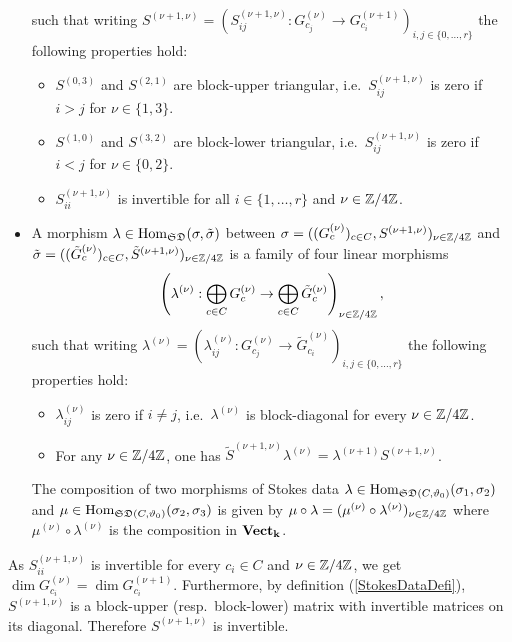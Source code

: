 \begin{defi}
\begin{itemize}
        such that writing $S^{(\nu+1,\nu)}=(S^{(\nu+1,\nu)}_{ij}:G_{c_j}^{(\nu)} \to G_{c_i}^{(\nu+1)})_{i,j \in \{0,\dots,r\}}$ the following properties hold:
        \begin{itemize}
            \item $S^{(0,3)}$ and $S^{(2,1)}$ are block-upper triangular, i.e.\ $S^{(\nu+1,\nu)}_{ij}$ is zero if $i > j$ for $\nu \in \{1,3\}$.
            \item $S^{(1,0)}$ and $S^{(3,2)}$ are block-lower triangular, i.e.\ $S^{(\nu+1,\nu)}_{ij}$ is zero if $i < j$ for $\nu \in \{0,2\}$.
            \item $S_{ii}^{(\nu+1,\nu)}$ is invertible for all $i \in \{1, \dots, r\}$ and $\nu \in \mathbb{Z}/4\mathbb{Z}$.
        \end{itemize}
        \item A morphism $\lambda \in \operatorname{Hom}_{\mathfrak{SD}}(\sigma, \tilde{\sigma})$ between $\sigma = ((G_c^{(\nu)})_{c \in C}, S^{(\nu+1, \nu)})_{\nu \in \mathbb{Z}/4\mathbb{Z}}$ and $\tilde{\sigma}=((\tilde{G}_c^{(\nu)})_{c \in C}, \tilde{S}^{(\nu+1, \nu)})_{\nu \in \mathbb{Z}/4\mathbb{Z}}$ is a family of four linear morphisms \[\left(\lambda^{(\nu)}:\bigoplus_{c \in C}G_c^{(\nu)}\to\bigoplus_{c \in C}\tilde{G}_c^{(\nu)} \right)_{\nu \in \mathbb{Z}/4\mathbb{Z}},\] such that writing $\lambda^{(\nu)} =(\lambda^{(\nu)}_{ij}:G_{c_j}^{(\nu)} \to \tilde{G}_{c_i}^{(\nu)})_{i,j \in \{0, \dots, r\}}$ the following properties hold:
        \begin{itemize}
            \item $\lambda^{(\nu)}_{ij}$ is zero if $i \neq j$, i.e.\ $\lambda^{(\nu)}$ is block-diagonal for every $\nu \in \mathbb{Z}/4\mathbb{Z}$.
            \item For any $\nu \in \mathbb{Z}/4\mathbb{Z}$, one has $\tilde{S}^{(\nu+1,\nu)}\lambda^{(\nu)} = \lambda^{(\nu+1)}S^{(\nu+1, \nu)}$.
        \end{itemize}
        The composition of two morphisms of Stokes data $\lambda \in \operatorname{Hom}_{\mathfrak{SD}(C,\vartheta_0)}(\sigma_1, \sigma_2)$ and $\mu \in \operatorname{Hom}_{\mathfrak{SD}(C, \vartheta_0)}(\sigma_2, \sigma_3)$ is given by $\mu\circ\lambda = (\mu^{(\nu)}\circ\lambda^{(\nu)})_{\nu \in \mathbb{Z}/4\mathbb{Z}}$ where $\mu^{(\nu)}\circ \lambda^{(\nu)}$ is the composition in $\mathbf{Vect}_{\mathbf{k}}$. 
    \end{itemize}
 \end{defi}

 \begin{rem}
    As $S_{ii}^{(\nu+1,\nu)}$ is invertible for every $c_i \in C$ and $\nu \in \mathbb{Z}/4\mathbb{Z}$, we get $\dim G_{c_i}^{(\nu)} = \dim G_{c_i}^{(\nu+1)}$. Furthermore, by definition (\ref{StokesDataDefi}), $S^{(\nu+1,\nu)}$ is a block-upper (resp.\ block-lower) matrix with invertible matrices on its diagonal. Therefore $S^{(\nu+1,\nu)}$ is invertible.
\end{rem}


